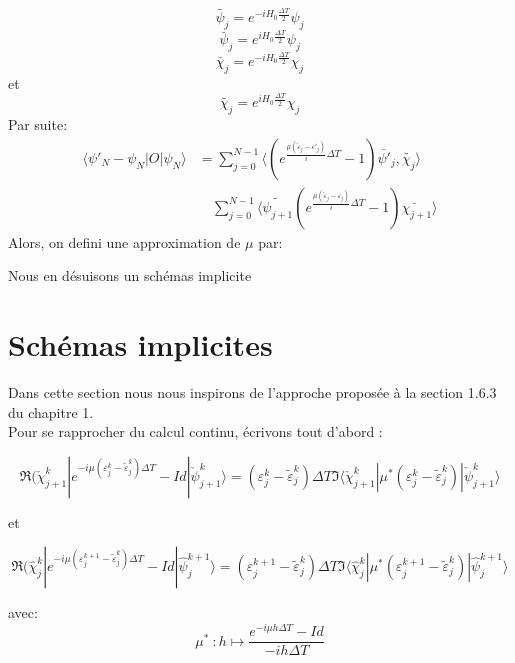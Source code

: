\begin{equation}
\tilde{\psi_j} = e^{-iH_0 \frac{\Delta T}{2}} \psi_j
\end{equation}
\begin{equation}
\breve{\psi_j} = e^{iH_0 \frac{\Delta T}{2}} \psi_j
\end{equation}
\begin{equation}
\breve{\chi_j} = e^{-iH_0 \frac{\Delta T}{2}} \chi_j
\end{equation}
et
\begin{equation}
\tilde{\chi_j} = e^{iH_0 \frac{\Delta T}{2}} \chi_j
\end{equation}
Par suite:
\begin{align*}
\langle \psi'_N-\psi_N |O|\psi_N \rangle &= \sum_{j=0}^{N-1} \langle (e^{\frac{\mu(\tilde{\varepsilon}_j-\varepsilon'_j)}{i}\Delta T}-1)\breve{\psi'_j} , \tilde{\chi_j} \rangle\\
&\quad \sum_{j=0}^{N-1} \langle \tilde{\psi_{j+1}} (e^{\frac{\mu(\tilde{\varepsilon}_j-\varepsilon_j)}{i}\Delta T}-1)\breve{\chi_{j+1}} \rangle
\end{align*}
Alors, on defini une approximation de $\mu$ par:

Nous en désuisons un schémas implicite

\section{Schémas implicites}

Dans cette section nous nous inspirons de l’approche proposée à la section 1.6.3 du chapitre 1.
\\Pour se rapprocher du calcul continu, écrivons tout d’abord :

$$ \Re(\check{\chi}^k_{j+1}|e^{-i\mu(\varepsilon^k_j-\tilde{\varepsilon}^k_j)\Delta T}-Id|\check{\psi}^k_{j+1}\rangle = (\varepsilon_j^k - \tilde{\varepsilon}_j^k) \Delta T \Im \langle  \check{\chi}^k_{j+1}|\mu^*(\varepsilon^k_j-\tilde{\varepsilon}^k_j)|\check{\psi}^k_{j+1} \rangle$$

et

$$ \Re(\hat{\chi}^k_{j}|e^{-i\mu(\varepsilon^{k+1}_j-\tilde{\varepsilon}^k_j)\Delta T}-Id|\hat{\psi}^{k+1}_j\rangle = (\varepsilon_j^{k+1} - \tilde{\varepsilon}_j^k) \Delta T \Im \langle  \hat{\chi}^k_{j}|\mu^*(\varepsilon^{k+1}_j-\tilde{\varepsilon}^k_j)|\hat{\psi}^{k+1}_{j} \rangle$$

avec:
\begin{equation}
\mu^*\ :h \mapsto \frac{e^{-i\mu h \Delta T} -Id}{-ih\Delta T}
\end{equation}

